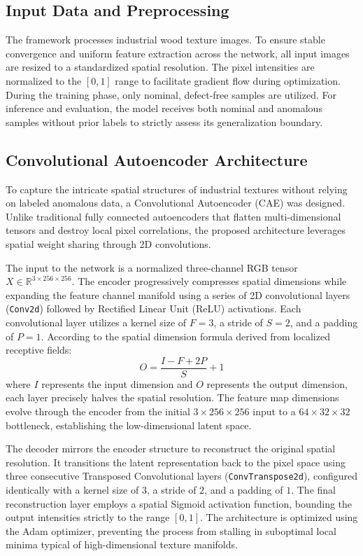 \documentclass[10pt,twocolumn,a4paper]{article}
\begin{document}
\subsection{Input Data and Preprocessing}
The framework processes industrial wood texture images. To ensure stable convergence and uniform feature extraction across the network, all input images are resized to a standardized spatial resolution. The pixel intensities are normalized to the $[0, 1]$ range to facilitate gradient flow during optimization. During the training phase, only nominal, defect-free samples are utilized. For inference and evaluation, the model receives both nominal and anomalous samples without prior labels to strictly assess its generalization boundary.

\subsection{Convolutional Autoencoder Architecture}
To capture the intricate spatial structures of industrial textures without relying on labeled anomalous data, a Convolutional Autoencoder (CAE) was designed. Unlike traditional fully connected autoencoders that flatten multi-dimensional tensors and destroy local pixel correlations, the proposed architecture leverages spatial weight sharing through 2D convolutions.

The input to the network is a normalized three-channel RGB tensor $X \in \mathbb{R}^{3 \times 256 \times 256}$. The encoder progressively compresses spatial dimensions while expanding the feature channel manifold using a series of 2D convolutional layers (\texttt{Conv2d}) followed by Rectified Linear Unit (ReLU) activations. Each convolutional layer utilizes a kernel size of $F=3$, a stride of $S=2$, and a padding of $P=1$. According to the spatial dimension formula derived from localized receptive fields:
\begin{equation}
O = \frac{I - F + 2P}{S} + 1
\end{equation}
where $I$ represents the input dimension and $O$ represents the output dimension, each layer precisely halves the spatial resolution. The feature map dimensions evolve through the encoder from the initial $3 \times 256 \times 256$ input to a $64 \times 32 \times 32$ bottleneck, establishing the low-dimensional latent space.

The decoder mirrors the encoder structure to reconstruct the original spatial resolution. It transitions the latent representation back to the pixel space using three consecutive Transposed Convolutional layers (\texttt{ConvTranspose2d}), configured identically with a kernel size of $3$, a stride of $2$, and a padding of $1$. The final reconstruction layer employs a spatial Sigmoid activation function, bounding the output intensities strictly to the range $[0, 1]$. The architecture is optimized using the Adam optimizer, preventing the process from stalling in suboptimal local minima typical of high-dimensional texture manifolds.
\end{document}
